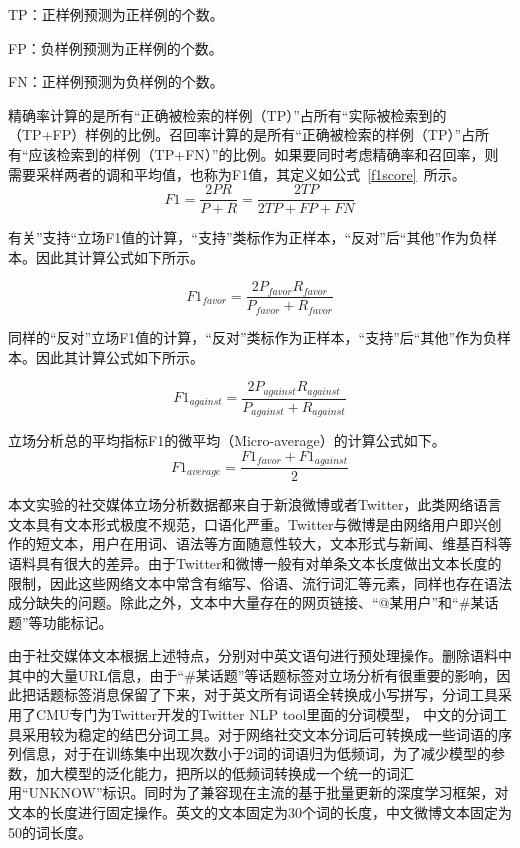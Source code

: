 TP：正样例预测为正样例的个数。

FP：负样例预测为正样例的个数。

FN：正样例预测为负样例的个数。

精确率计算的是所有“正确被检索的样例（TP）”占所有“实际被检索到的（TP+FP）样例的比例。召回率计算的是所有“正确被检索的样例（TP）”占所有“应该检索到的样例（TP+FN）”的比例。如果要同时考虑精确率和召回率，则需要采样两者的调和平均值，也称为F1值，其定义如公式~\ref{f1score}~所示。
\begin{equation}\label{f1score}F1=\frac{2PR}{P+R}=\frac{2TP}{2TP+FP+FN}\end{equation}

有关”支持“立场F1值的计算，“支持”类标作为正样本，“反对”后“其他”作为负样本。因此其计算公式如下所示。

\begin{equation}\label{f1favor}F1_{favor}=\frac{2P_{favor}R_{favor}}{P_{favor}+R_{favor}}\end{equation}

同样的“反对”立场F1值的计算，“反对”类标作为正样本，“支持”后“其他”作为负样本。因此其计算公式如下所示。

\begin{equation}\label{f1against}F1_{against}=\frac{2P_{against}R_{against}}{P_{against}+R_{against}}\end{equation}

立场分析总的平均指标F1的微平均（Micro-average）的计算公式如下。
\begin{equation}\label{f1average}F1_{average}=\frac{F1_{favor}+F1_{against}}{2}\end{equation}

本文实验的社交媒体立场分析数据都来自于新浪微博或者Twitter，此类网络语言文本具有文本形式极度不规范，口语化严重。Twitter与微博是由网络用户即兴创作的短文本，用户在用词、语法等方面随意性较大，文本形式与新闻、维基百科等语料具有很大的差异。由于Twitter和微博一般有对单条文本长度做出文本长度的限制，因此这些网络文本中常含有缩写、俗语、流行词汇等元素，同样也存在语法成分缺失的问题。除此之外，文本中大量存在的网页链接、“@某用户”和“\#某话题”等功能标记。

由于社交媒体文本根据上述特点，分别对中英文语句进行预处理操作。删除语料中其中的大量URL信息，由于“\#某话题”等话题标签对立场分析有很重要的影响，因此把话题标签消息保留了下来，对于英文所有词语全转换成小写拼写，分词工具采用了CMU专门为Twitter开发的Twitter NLP tool里面的分词模型， 中文的分词工具采用较为稳定的结巴分词工具。对于网络社交文本分词后可转换成一些词语的序列信息，对于在训练集中出现次数小于2词的词语归为低频词，为了减少模型的参数，加大模型的泛化能力，把所以的低频词转换成一个统一的词汇用“UNKNOW”标识。同时为了兼容现在主流的基于批量更新的深度学习框架，对文本的长度进行固定操作。英文的文本固定为30个词的长度，中文微博文本固定为50的词长度。

